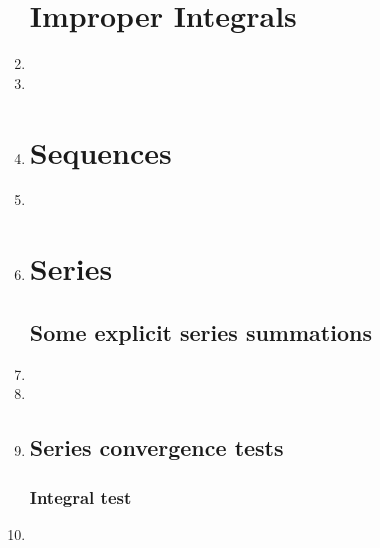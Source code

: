 \documentclass{article}
\begin{document}
\begin{enumerate}
\section{Improper Integrals}
\item 

\item 

\item 

\section{Sequences}
\item 

\item 

\section{Series}
\subsection{Some explicit series summations}
\item 
\item 


\item 


\subsection{Series convergence tests}
\subsubsection{Integral test}
\item 

\end{enumerate}
\end{document}
